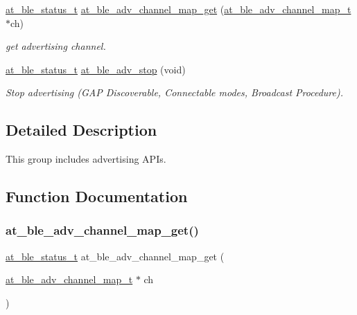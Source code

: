 \begin{DoxyCompactItemize}
\mbox{\hyperlink{group__error__codes__group_ga3b1db9b95feb157b3c188ca27fe76988}{at\+\_\+ble\+\_\+status\+\_\+t}} \mbox{\hyperlink{group__gap__adv__group_gabcab9fff7caab6392cddd66bac148f33}{at\+\_\+ble\+\_\+adv\+\_\+channel\+\_\+map\+\_\+get}} (\mbox{\hyperlink{at__ble__api_8h_ae3d53ccdbeba291d4765432f6a9d33ca}{at\+\_\+ble\+\_\+adv\+\_\+channel\+\_\+map\+\_\+t}} $\ast$ch)
\begin{DoxyCompactList}\small\item\em get advertising channel. \end{DoxyCompactList}\item 
\mbox{\hyperlink{group__error__codes__group_ga3b1db9b95feb157b3c188ca27fe76988}{at\+\_\+ble\+\_\+status\+\_\+t}} \mbox{\hyperlink{group__gap__adv__group_ga1a6b3d740eb88e63553f794fd59ffbc3}{at\+\_\+ble\+\_\+adv\+\_\+stop}} (void)
\begin{DoxyCompactList}\small\item\em Stop advertising (G\+AP Discoverable, Connectable modes, Broadcast Procedure). \end{DoxyCompactList}\end{DoxyCompactItemize}


\subsection{Detailed Description}
This group includes advertising A\+P\+Is. 



\subsection{Function Documentation}
\mbox{\label{group__gap__adv__group_gabcab9fff7caab6392cddd66bac148f33}} 
\subsubsection{\texorpdfstring{at\_ble\_adv\_channel\_map\_get()}{at\_ble\_adv\_channel\_map\_get()}}
{\footnotesize\ttfamily \mbox{\hyperlink{group__error__codes__group_ga3b1db9b95feb157b3c188ca27fe76988}{at\+\_\+ble\+\_\+status\+\_\+t}} at\+\_\+ble\+\_\+adv\+\_\+channel\+\_\+map\+\_\+get (\begin{DoxyParamCaption}\item[{\mbox{\hyperlink{at__ble__api_8h_ae3d53ccdbeba291d4765432f6a9d33ca}{at\+\_\+ble\+\_\+adv\+\_\+channel\+\_\+map\+\_\+t}} $\ast$}]{ch }\end{DoxyParamCaption})}



